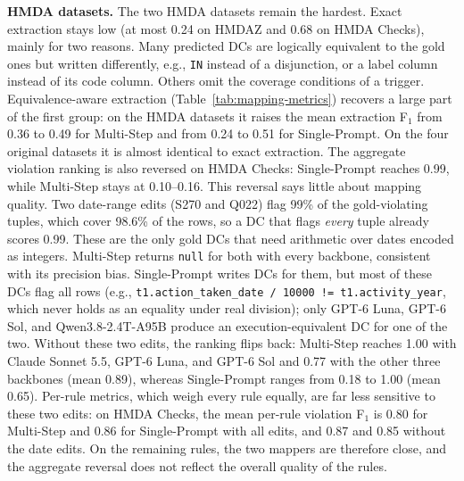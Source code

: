 \smallskip\noindent\textbf{HMDA datasets.}
The two HMDA datasets remain the hardest. Exact extraction stays low (at most
0.24 on HMDAZ and 0.68 on HMDA Checks), mainly for two reasons. Many predicted
DCs are logically equivalent to the gold ones but written differently, e.g.,
\texttt{IN} instead of a disjunction, or a label column instead of its code
column. Others omit the coverage conditions of a trigger. Equivalence-aware
extraction (Table~\ref{tab:mapping-metrics}) recovers a large part of the first
group: on the HMDA datasets it raises the mean extraction F$_1$ from 0.36 to
0.49 for Multi-Step and from 0.24 to 0.51 for Single-Prompt. On the four original
datasets it is almost identical to exact extraction. The aggregate violation
ranking is also reversed on HMDA Checks: Single-Prompt reaches 0.99, while
Multi-Step stays at 0.10--0.16. This reversal says little about mapping quality.
Two date-range edits (S270 and Q022) flag 99\% of the gold-violating tuples, which
cover 98.6\% of the rows, so a DC that flags \emph{every} tuple already scores 0.99.
These are the only gold DCs that need arithmetic over dates encoded as integers.
Multi-Step returns \texttt{null} for both with every backbone, consistent with its
precision bias. Single-Prompt writes DCs for them, but most of these DCs flag all
rows (e.g., \texttt{t1.action\_taken\_date / 10000 != t1.activity\_year}, which
never holds as an equality under real division); only GPT-6 Luna, GPT-6 Sol, and
Qwen3.8-2.4T-A95B produce an execution-equivalent DC for one of the two. Without these
two edits, the ranking flips back: Multi-Step reaches 1.00 with Claude Sonnet 5.5,
GPT-6 Luna, and GPT-6 Sol and 0.77 with the other three backbones (mean 0.89),
whereas Single-Prompt ranges from 0.18 to 1.00 (mean 0.65). Per-rule metrics,
which weigh every rule equally, are far less sensitive to these two edits: on
HMDA Checks, the mean per-rule violation F$_1$ is 0.80 for Multi-Step and 0.86 for
Single-Prompt with all edits, and 0.87 and 0.85 without the date edits. On the
remaining rules, the two mappers are therefore close, and the aggregate
reversal does not reflect the overall quality of the rules.

\begin{table}[!ht]
  \centering
  \small
  \setlength{\tabcolsep}{3.5pt}
  
  \caption{Mean mapping quality over the six datasets (ground-truth sentences
  only). CE: exact extraction F$_1$; CE$_{\equiv}$: equivalence-aware extraction
  F$_1$; AV: aggregate violation F$_1$; Rule-F$_1$: mean per-rule violation F$_1$;
  Exec.: execution equivalence; Fail.: sentences with no valid model output.}
  \label{tab:mapping-metrics}
\end{table}

